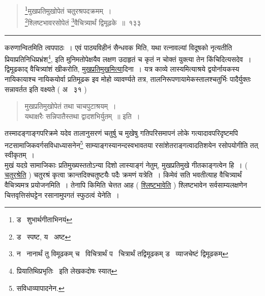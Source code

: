 \documentclass[11pt, openany]{book}
\begin{document}
\newpage

\begin{quote}
{\na \renewcommand{\thefootnote}{1}\footnote{ड \textendash\ शुभार्थगीताभिनयं}मुखप्रतिमुखोपेतं चतुरश्रपदक्रमम्~।\\
\renewcommand{\thefootnote}{2}\footnote{ड \textendash\ स्पष्ट, य \textendash\ अष्ट}श्लिष्टभावरसोपेतं \renewcommand{\thefootnote}{3}\footnote{न \textendash\ नानार्थं तु विमूढकम् च \textendash\ विचित्रार्थं प \textendash\ चित्रार्थं तद्विमूढकम् ड \textendash\ व्याजचेष्टं द्विमूढकम्}वैचित्र्यार्थं द्विमूढके~॥~१३३}
\end{quote}

\hrule

\vspace{2mm}
करुणान्वितमिति त्वपपाठः~। एवं {\qt पाठ्यविहीनं सैन्धवक} मिति, यथा रत्नावल्यां विदूषको नृत्यतीति प्रियाप्रतिनिधिप्रभ्रंश\renewcommand{\thefootnote}{1}\footnote{प्रियातिथिप्रभृतिः \textendash\ इति लेखकदोषः स्यात्}, इति मुनिमतोपेक्षयैव लक्षण उदाहृतं च कृतं न चोक्तं युक्त्या तेन किंचिदित्यसदेव~।\\

द्विमूढकाद् वैचित्र्यांशं खीकरोति, \underline{मुखप्रतिमुखमित्या}दिना~। यत्र काव्ये लास्यमित्याश्रये द्वयोर्नायकस्य नायिकायाश्च नायिकयोर्वा प्रतिमूढक इव मोहो व्यावर्ण्यते तत्र, तालनिरूपणायामेकस्तालश्चतुर्भिः पादैर्युक्तः सन्नावर्तत इति वक्ष्यते ( अ \textendash\ ३१ ) \textendash

\begin{quote}
{\qt मुखप्रतिमुखोपेतं तथा चाचपुटाश्रयम्~।\\
यथाक्षरैः सन्निपातैस्तथा द्वादशभिर्युतम्~॥} इति~।
\end{quote}

\noindent
तस्मादङ्गाङ्गपरिक्रमे यदेव तालानुसरणं चतुर्षु च मुखेषु गतिपरिसमापनं लोके गत्यादावपरिदृष्टमपि नटसामाजिकवर्गसविधाध्यासनेन\renewcommand{\thefootnote}{2}\footnote{सविधाव्यापादनेन.} साम्याङ्गस्यानन्दस्वभावतया रसांशेतराङ्गत्वादतिशयेन रसोपयोगीति तत् स्वीकृतम्~।\\

मुखं यदग्रे सामाजिकाः प्रतिमुख्यस्ततोऽन्या दिशो लास्याङ्गं नेतुम्, मुखप्रतिमुखे गीतकाङ्गत्वेन हि~। ( \underline{चतुरश्रेति} ) चतुरश्रं कृत्वा क्रान्तदिक्चतुष्टयैः पदैः क्रमणं यत्रेति~। किमेवं सति भवतीत्याह वैचित्र्यार्थं वैचित्र्यमत्र प्रयोजनमिति~। तेनापि किमिति चेत्तत आह ( \underline{श्लिष्टभावेति} ) श्लिष्टभावेन सर्वसाम्यलक्षणेन चित्तवृत्तिसंघट्टेन रसानामुपगतं स्फुठत्वं येनेति~।


\newpage
\lfoot{}
\end{document}
